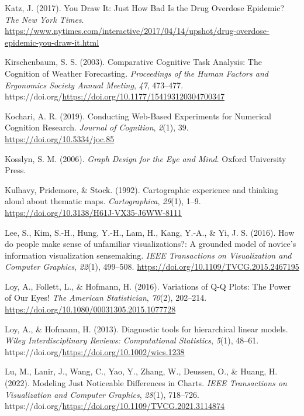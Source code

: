 \documentclass[
  10pt,
  letterpaper,
  DIV=11,
  numbers=noendperiod]{scrartcl}
\newlength{\cslhangindent}
\newenvironment{CSLReferences}[2] %
 {\begin{list}{}{%
  \setlength{\itemindent}{0pt}
  \setlength{\leftmargin}{0pt}
  \setlength{\parsep}{0pt}
  \ifodd #1
   \setlength{\leftmargin}{\cslhangindent}
   \setlength{\itemindent}{-1\cslhangindent}
  \fi
  \setlength{\itemsep}{#2\baselineskip}}}
 {\end{list}}
\begin{document}
\begin{CSLReferences}{1}{0}
Katz, J. (2017). You {Draw} {It}: {Just} {How} {Bad} {Is} the {Drug}
{Overdose} {Epidemic}? \emph{The New York Times}.
\url{https://www.nytimes.com/interactive/2017/04/14/upshot/drug-overdose-epidemic-you-draw-it.html}

Kirschenbaum, S. S. (2003). Comparative {Cognitive} {Task} {Analysis}:
{The} {Cognition} of {Weather} {Forecasting}. \emph{Proceedings of the
{Human} {Factors} and {Ergonomics} {Society} {Annual} {Meeting}},
\emph{47}, 473--477.
https://doi.org/\url{https://doi.org/10.1177/154193120304700347}

Kochari, A. R. (2019). Conducting {Web-Based Experiments} for {Numerical
Cognition Research}. \emph{Journal of Cognition}, \emph{2}(1), 39.
\url{https://doi.org/10.5334/joc.85}

Kosslyn, S. M. (2006). \emph{Graph {Design} for the {Eye} and {Mind}}.
Oxford University Press.

Kulhavy, Pridemore, \& Stock. (1992). Cartographic experience and
thinking aloud about thematic maps. \emph{Cartographica}, \emph{29}(1),
1--9. \url{https://doi.org/10.3138/H61J-VX35-J6WW-8111}

Lee, S., Kim, S.-H., Hung, Y.-H., Lam, H., Kang, Y.-A., \& Yi, J. S.
(2016). How do people make sense of unfamiliar visualizations?: A
grounded model of novice's information visualization sensemaking.
\emph{{IEEE} Transactions on Visualization and Computer Graphics},
\emph{22}(1), 499--508. \url{https://doi.org/10.1109/TVCG.2015.2467195}

Loy, A., Follett, L., \& Hofmann, H. (2016). Variations of {Q-Q Plots}:
{The Power} of {Our Eyes}! \emph{The American Statistician},
\emph{70}(2), 202--214.
\url{https://doi.org/10.1080/00031305.2015.1077728}

Loy, A., \& Hofmann, H. (2013). Diagnostic tools for hierarchical linear
models. \emph{Wiley Interdisciplinary Reviews: Computational
Statistics}, \emph{5}(1), 48--61.
https://doi.org/\url{https://doi.org/10.1002/wics.1238}

Lu, M., Lanir, J., Wang, C., Yao, Y., Zhang, W., Deussen, O., \& Huang,
H. (2022). Modeling {Just} {Noticeable} {Differences} in {Charts}.
\emph{IEEE Transactions on Visualization and Computer Graphics},
\emph{28}(1), 718--726.
https://doi.org/\url{https://doi.org/10.1109/TVCG.2021.3114874}


\end{CSLReferences}
\end{document}
